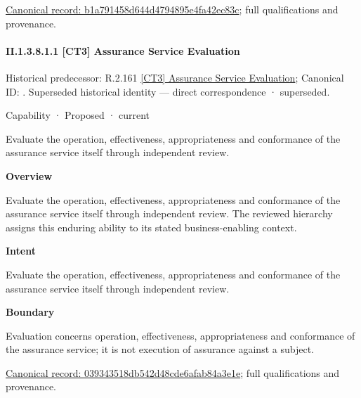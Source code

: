 {\footnotesize \href{../../../../../../../continuum/strategy/capability/b1a791458d644d4794895e4fa42ec83c.md}{Canonical record: b1a791458d644d4794895e4fa42ec83c}; full qualifications and provenance.}\par
\paragraph*{II.1.3.8.1.1 [CT3] Assurance Service Evaluation}
\label{navigation:II.1.3.8.1.1}

{\small Historical predecessor: R.2.161 \hyperref[element:be34b54314c6444f8418d645f6c83b6d]{[CT3] Assurance Service Evaluation}; Canonical ID: \texttt{}. Superseded historical identity — direct correspondence · superseded.}\par
\label{element:039343518db542d48cde6afab84a3e1e}
{\small Capability · Proposed · current}\par

Evaluate the operation, effectiveness, appropriateness and conformance of the assurance service itself through independent review.



\textbf{Overview}



Evaluate the operation, effectiveness, appropriateness and conformance of the assurance service itself through independent review. The reviewed hierarchy assigns this enduring ability to its stated business-enabling context.



\textbf{Intent}



Evaluate the operation, effectiveness, appropriateness and conformance of the assurance service itself through independent review.



\textbf{Boundary}



Evaluation concerns operation, effectiveness, appropriateness and conformance of the assurance service; it is not execution of assurance against a subject.


{\footnotesize \href{../../../../../../../continuum/strategy/capability/039343518db542d48cde6afab84a3e1e.md}{Canonical record: 039343518db542d48cde6afab84a3e1e}; full qualifications and provenance.}\par
